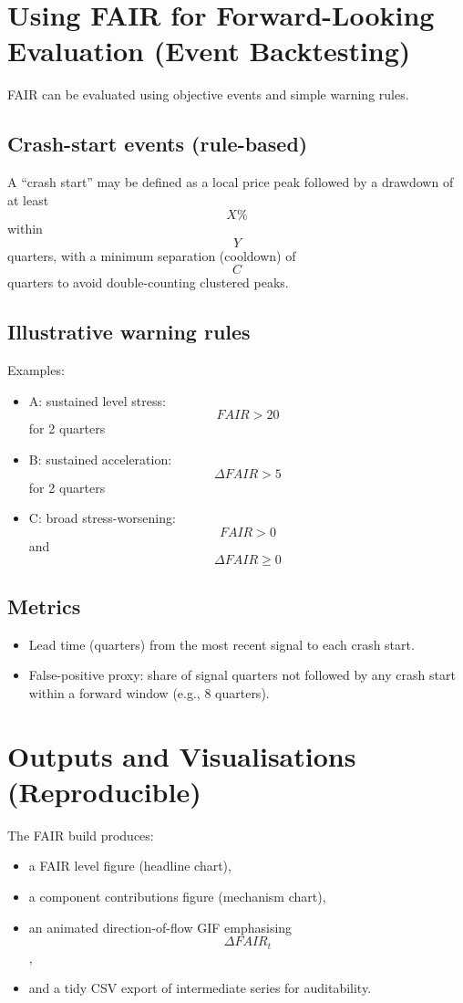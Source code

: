 \documentclass[11pt,a4paper]{article}
\begin{document}
\section{Using FAIR for Forward-Looking Evaluation (Event Backtesting)}
FAIR can be evaluated using objective events and simple warning rules.

\subsection{Crash-start events (rule-based)}
A ``crash start'' may be defined as a local price peak followed by a drawdown of at least $$X\%$$ within $$Y$$ quarters, with a minimum separation (cooldown) of $$C$$ quarters to avoid double-counting clustered peaks.

\subsection{Illustrative warning rules}
Examples:
\begin{itemize}
  \item A: sustained level stress: $$FAIR > 20$$ for 2 quarters
  \item B: sustained acceleration: $$\Delta FAIR > 5$$ for 2 quarters
  \item C: broad stress-worsening: $$FAIR > 0$$ and $$\Delta FAIR \ge 0$$
\end{itemize}

\subsection{Metrics}
\begin{itemize}
  \item Lead time (quarters) from the most recent signal to each crash start.
  \item False-positive proxy: share of signal quarters not followed by any crash start within a forward window (e.g., 8 quarters).
\end{itemize}

\section{Outputs and Visualisations (Reproducible)}
The FAIR build produces:
\begin{itemize}
  \item a FAIR level figure (headline chart),
  \item a component contributions figure (mechanism chart),
  \item an animated direction-of-flow GIF emphasising $$\Delta FAIR_t$$,
  \item and a tidy CSV export of intermediate series for auditability.
\end{itemize}
\end{document}
